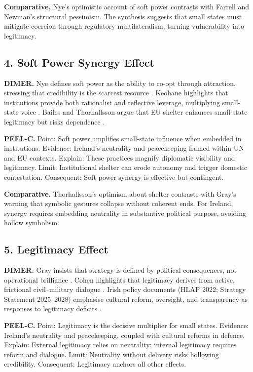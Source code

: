 \textbf{Comparative.} Nye’s optimistic account of soft power contrasts with Farrell and Newman’s structural pessimism. The synthesis suggests that small states must mitigate coercion through regulatory multilateralism, turning vulnerability into legitimacy.

\subsection*{4. Soft Power Synergy Effect}
\textbf{DIMER.} Nye defines soft power as the ability to co-opt through attraction, stressing that credibility is the scarcest resource \parencite{NYE_2008}. Keohane highlights that institutions provide both rationalist and reflective leverage, multiplying small-state voice \parencite{KEOHANE_1988}. Bailes and Thorhallsson argue that EU shelter enhances small-state legitimacy but risks dependence \parencite{BAILES_2013}. 

\textbf{PEEL-C.} Point: Soft power amplifies small-state influence when embedded in institutions. Evidence: Ireland’s neutrality and peacekeeping framed within UN and EU contexts. Explain: These practices magnify diplomatic visibility and legitimacy. Limit: Institutional shelter can erode autonomy and trigger domestic contestation. Consequent: Soft power synergy is effective but contingent. 

\textbf{Comparative.} Thorhallsson’s optimism about shelter contrasts with Gray’s warning that symbolic gestures collapse without coherent ends. For Ireland, synergy requires embedding neutrality in substantive political purpose, avoiding hollow symbolism.

\subsection*{5. Legitimacy Effect}
\textbf{DIMER.} Gray insists that strategy is defined by political consequences, not operational brilliance \parencite{GRAY_2018}. Cohen highlights that legitimacy derives from active, frictional civil–military dialogue \parencite{COHEN_2002}. Irish policy documents (HLAP 2022; Strategy Statement 2025–2028) emphasise cultural reform, oversight, and transparency as responses to legitimacy deficits \parencite{DOD_2025}. 

\textbf{PEEL-C.} Point: Legitimacy is the decisive multiplier for small states. Evidence: Ireland’s neutrality and peacekeeping, coupled with cultural reforms in defence. Explain: External legitimacy relies on neutrality; internal legitimacy requires reform and dialogue. Limit: Neutrality without delivery risks hollowing credibility. Consequent: Legitimacy anchors all other effects. 

